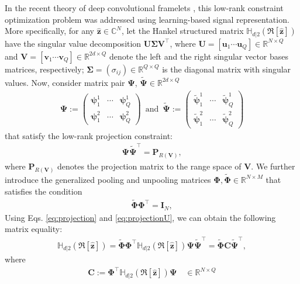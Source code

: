 \documentclass[10pt,journal]{IEEEtran}
\newcommand{\bu}{\mathbf{u}}
\newcommand{\bv}{\mathbf{v}}
\newcommand{\Cb}{{\mathbf{C}}}
\newcommand{\Ib}{{\mathbf I}}
\newcommand{\Pb}{{\mathbf P}}
\newcommand{\Ub}{{\mathbf U}}
\newcommand{\Vb}{{\mathbf V}}
\newcommand{\zb}{{\mathbf z}}
\newcommand{\Phib}{{\boldsymbol {\Phi}}}
\newcommand{\Psib}{{\boldsymbol {\Psi}}}
\newcommand{\Sigmab}{{\boldsymbol {\Sigma}}}
\newcommand{\Rd}{{\mathbb R}}
\newcommand{\Cd}{{\mathbb C}}
\newcommand{\psib}{{\boldsymbol{\psi}}}
\newcommand{\0}{{\boldsymbol{0}}}
\newcommand{\hank}{\mathbb{H}}
\newcommand{\Rbc}{{\mathfrak{R}}}
\begin{document}
In the recent theory of deep convolutional framelets \cite{ye2017deep}, 
this low-rank constraint optimization problem was addressed  using  learning-based signal representation.
More specifically,
 for any  $\widehat \zb\in \Cd^N$, let the Hankel structured matrix $\hank_{d|2}\left(\Rbc[\widehat \zb ]\right)$
 have  the singular value decomposition
$\Ub \Sigmab \Vb^{\top}$, 
where $\Ub =[\bu_1 \cdots \bu_Q] \in \Rd^{N\times Q}$ and $\Vb=[\bv_1\cdots \bv_Q]\in \Rd^{2d \times Q}$ denote the left and the right singular vector bases matrices, respectively;
$\Sigmab=(\sigma_{ij})\in\mathbb{R}^{Q\times Q}$ is the diagonal matrix with singular values.  
Now, consider
matrix pair  $\Psib$, $\tilde \Psib\in \Rd^{2d \times Q}$ 
\begin{eqnarray}\label{eq:Psi}
\Psib:=
\begin{pmatrix}
\psib^{1}_{1} & \cdots & \psib^{1}_{Q}
\\
\psib^{2}_{1} & \cdots &\psib^{2}_{Q}
\end{pmatrix}
\,\text{ and }\,
\widetilde{\Psib}:=
\begin{pmatrix}
\tilde\psib^{1}_{1} & \cdots & \tilde\psib^{1}_{Q}
\\
\tilde\psib^{2}_{1} & \cdots &\tilde\psib^{2}_{Q}
\end{pmatrix}\end{eqnarray}
that 
satisfy the low-rank  projection constraint:
\begin{eqnarray}\label{eq:projection}
 \Psib \tilde \Psib^{\top} = \Pb_{R(\Vb)} ,
 \end{eqnarray}
 where $\Pb_{R(\Vb)}$ denotes the projection matrix to the range space of $\Vb$.
 We further introduce the generalized pooling and unpooling matrices $\Phib,\widetilde\Phib\in \Rd^{N\times M}$ \cite{ye2017deep} that
 satisfies the condition
\begin{eqnarray}\label{eq:projectionU}
 \widetilde\Phib \Phib^{\top} =\Ib_N, \end{eqnarray} 
 Using Eqs. \eqref{eq:projection} and \eqref{eq:projectionU},  we can obtain the following matrix equality:
\begin{eqnarray}\label{eq:B}
\hank_{d|2}\left(\Rbc[\widehat \zb ]\right) = \widetilde\Phib \Phib^{\top}\hank_{d|2}\left(\Rbc[\widehat \zb ]\right) \Psib \tilde \Psib^{\top} =  \widetilde\Phib \Cb \tilde \Psib^{\top},  \label{eq:equiv}
\end{eqnarray}
where 
\begin{eqnarray}\label{eq:C}
\Cb :=  \Phib^{\top}\hank_{d|2}\left(\Rbc[\widehat \zb ]\right)  \Psib \quad   \in  \Rd^{N\times Q}
\end{eqnarray}
\end{document}
